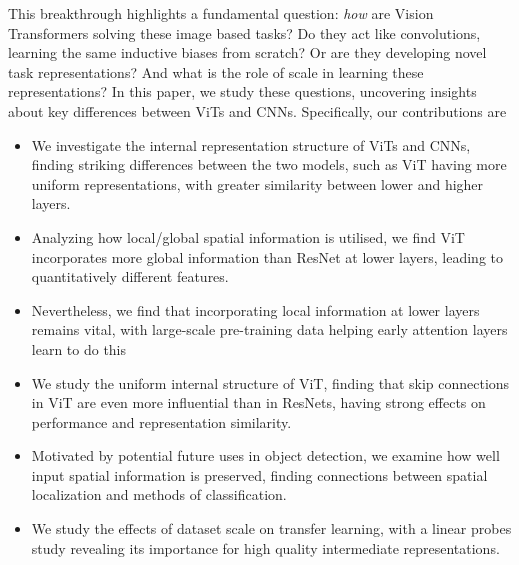 \documentclass{article}
\begin{document}
This breakthrough highlights a fundamental question: \textit{how} are Vision Transformers solving these image based tasks? Do they act like convolutions, learning the same inductive biases from scratch? Or are they developing novel task representations? And what is the role of scale in learning these representations? In this paper, we study these questions, uncovering insights about key differences between ViTs and CNNs. Specifically, our contributions are 
\begin{itemize}[leftmargin=1em,itemsep=0em,topsep=0em]
    \item We investigate the internal representation structure of ViTs and CNNs, finding striking differences between the two models, such as ViT having more uniform representations, with greater similarity between lower and higher layers.
    \item Analyzing how local/global spatial information is utilised, we find ViT incorporates more global information than ResNet at lower layers, leading to quantitatively different features.   
    \item Nevertheless, we find that incorporating local information at lower layers remains vital, with large-scale pre-training data helping early attention layers learn to do this 
    \item We study the uniform internal structure of ViT, finding that skip connections in ViT are even more influential than in ResNets, having strong effects on performance and representation similarity.
    \item Motivated by potential future uses in object detection, we examine how well input spatial information is preserved, finding connections between spatial localization and methods of classification.
    \item We study the effects of dataset scale on transfer learning, with a linear probes study revealing its importance for high quality intermediate representations.
\end{itemize}

\vspace{-0.25em}
\end{document}
